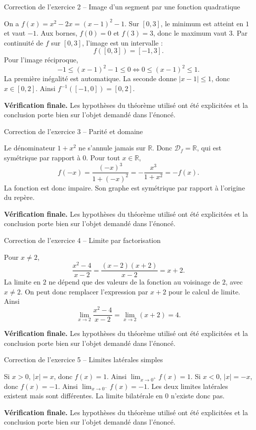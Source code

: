 \documentclass[11pt,a4paper]{article}
\newcommand{\R}{\mathbb{R}}
\newcommand{\dom}{\mathcal D}
\begin{document}
\begin{corrbox}{Correction de l'exercice 2 -- Image d'un segment par une fonction quadratique}

On a $f(x)=x^2-2x=(x-1)^2-1$. Sur $[0,3]$, le minimum est atteint en $1$ et vaut $-1$. Aux bornes, $f(0)=0$ et $f(3)=3$, donc le maximum vaut $3$. Par continuité de $f$ sur $[0,3]$, l'image est un intervalle :
\[
f([0,3])=[-1,3].
\]
Pour l'image réciproque,
\[
-1\leq (x-1)^2-1\leq0 \Longleftrightarrow 0\leq (x-1)^2\leq1.
\]
La première inégalité est automatique. La seconde donne $|x-1|\leq1$, donc $x\in[0,2]$. Ainsi $f^{-1}([-1,0])=[0,2]$.

\medskip
\textbf{Vérification finale.} Les hypothèses du théorème utilisé ont été explicitées et la conclusion porte bien sur l'objet demandé dans l'énoncé.
\end{corrbox}


\begin{corrbox}{Correction de l'exercice 3 -- Parité et domaine}

Le dénominateur $1+x^2$ ne s'annule jamais sur $\R$. Donc $\dom_f=\R$, qui est symétrique par rapport à $0$. Pour tout $x\in\R$,
\[
f(-x)=\frac{(-x)^3}{1+(-x)^2}=-\frac{x^3}{1+x^2}=-f(x).
\]
La fonction est donc impaire. Son graphe est symétrique par rapport à l'origine du repère.

\medskip
\textbf{Vérification finale.} Les hypothèses du théorème utilisé ont été explicitées et la conclusion porte bien sur l'objet demandé dans l'énoncé.
\end{corrbox}


\begin{corrbox}{Correction de l'exercice 4 -- Limite par factorisation}

Pour $x\neq2$,
\[
\frac{x^2-4}{x-2}=\frac{(x-2)(x+2)}{x-2}=x+2.
\]
La limite en $2$ ne dépend que des valeurs de la fonction au voisinage de $2$, avec $x\neq2$. On peut donc remplacer l'expression par $x+2$ pour le calcul de limite. Ainsi
\[
\lim_{x\to2}\frac{x^2-4}{x-2}=\lim_{x\to2}(x+2)=4.
\]

\medskip
\textbf{Vérification finale.} Les hypothèses du théorème utilisé ont été explicitées et la conclusion porte bien sur l'objet demandé dans l'énoncé.
\end{corrbox}


\begin{corrbox}{Correction de l'exercice 5 -- Limites latérales simples}

Si $x>0$, $|x|=x$, donc $f(x)=1$. Ainsi $\lim_{x\to0^+}f(x)=1$. Si $x<0$, $|x|=-x$, donc $f(x)=-1$. Ainsi $\lim_{x\to0^-}f(x)=-1$. Les deux limites latérales existent mais sont différentes. La limite bilatérale en $0$ n'existe donc pas.

\medskip
\textbf{Vérification finale.} Les hypothèses du théorème utilisé ont été explicitées et la conclusion porte bien sur l'objet demandé dans l'énoncé.
\end{corrbox}
\end{document}
